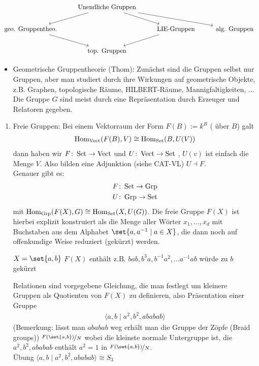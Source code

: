 \[
	\begin{tikzcd}
		& \text{Unendliche Gruppen} \arrow[rrd] \arrow[rd] \arrow[ld] &                               &                     \\
		\text{geo. Gruppentheo.} \arrow[rd] &                                                             & \text{LIE-Gruppen} \arrow[ld] & \text{alg. Gruppen} \\
		& \text{top. Gruppen}                                         &                               &                    
	\end{tikzcd}
\]
\begin{itemize}
	\item Geometrische Gruppentheorie (Thom): Zunächst sind die Gruppen selbst nur Gruppen, aber man studiert durch ihre Wirkungen auf geometrische Objekte, z.B. Graphen, topologische Räume, HILBERT-Räume, Mannigfaltigkeiten, ... \\
	Die Gruppe $G$ sind meist durch eine Repräsentation durch Erzeuger und Relatoren gegeben.
\end{itemize}
\begin{enumerate}
	\item Freie Gruppen: Bei einem Vektorraum der Form $F(B):= k^B$ ( über $B$) galt
	\begin{align*}
		\operatorname{Hom}_{\operatorname{Vect}}(F(B),V) \cong \operatorname{Hom}_{\operatorname{Set}}(B,U(V))
	\end{align*}
	dann haben wir $F \colon \operatorname{Set} \to \operatorname{Vect}$  und $U \colon \operatorname{Vect} \to \operatorname{Set}$ , $U(v)$ ist einfach die Menge $V$. Also bilden eine Adjunktion (siehe CAT-VL) $U \dashv F$.\\
	Genauer gibt es:
	\begin{align*}
		F\colon \operatorname{Set} \to \operatorname{Grp}\\
		U \colon \operatorname{Grp} \to \operatorname{Set}
	\end{align*}
	mit $\operatorname{Hom}_{\operatorname{Grp}}(F(X),G) \cong \operatorname{Hom}_{\operatorname{Set}}(X,U(G))$. Die freie Gruppe $F(X)$ ist hierbei explizit konstruiert als die Menge aller Wörter $x_1, \dots, x_d$ mit Buchstaben aus dem Alphabet $\set{a,a^{-1}\mid a \in X}$, die dann noch auf offenkundige Weise reduziert (gekürzt) werden.
	\begin{*example}
		$X = \set{a,b}$ $F(X)$ enthält z.B. $bab, b^3a, b^{-1}a^2, ... a^{-1}ab$ würde zu $b$ gekürzt
	\end{*example}
	Relationen sind vorgegebene Gleichung, die man festlegt um kleinere Gruppen als Quotienten von $F(X)$ zu definieren, also Präsentation einer Gruppe
	\begin{align*}
		\langle a,b \mid a^2, b^2, ababab\rangle
	\end{align*}
	(Bemerkung: lässt man $ababab$ weg erhält man die Gruppe der Zöpfe (Braid groups))
	$\lnkset{F(\set{a,b})}{N}$ wobei die kleinste normale Untergruppe ist, die $a^2,b^2,ababab$ enthält $a^2 = 1$ in $\lnkset{F(\set{a,b})}{N}$.\\
	Übung $\langle a,b \mid a^2, b^2, ababab\rangle \cong S_3$
\end{enumerate}
